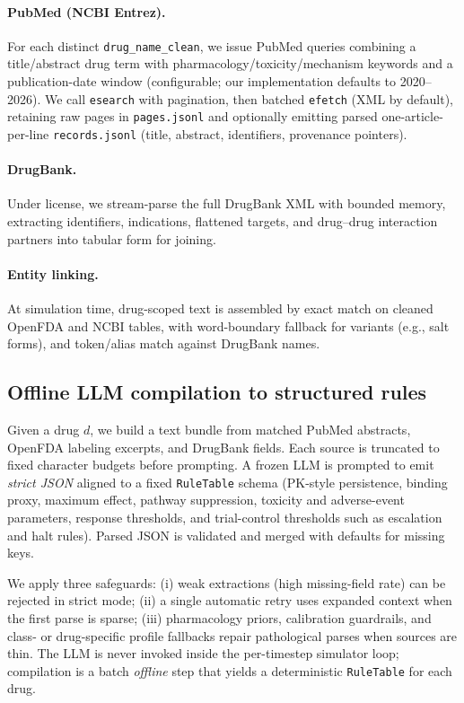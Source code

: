 \paragraph{PubMed (NCBI Entrez).}
For each distinct \texttt{drug\_name\_clean}, we issue PubMed queries combining a title/abstract drug term with pharmacology/toxicity/mechanism keywords and a publication-date window (configurable; our implementation defaults to 2020--2026). We call \texttt{esearch} with pagination, then batched \texttt{efetch} (XML by default), retaining raw pages in \texttt{pages.jsonl} and optionally emitting parsed one-article-per-line \texttt{records.jsonl} (title, abstract, identifiers, provenance pointers).

\paragraph{DrugBank.}
Under license, we stream-parse the full DrugBank XML with bounded memory, extracting identifiers, indications, flattened targets, and drug--drug interaction partners into tabular form for joining.

\paragraph{Entity linking.}
At simulation time, drug-scoped text is assembled by exact match on cleaned OpenFDA and NCBI tables, with word-boundary fallback for variants (e.g., salt forms), and token/alias match against DrugBank names.

\subsection{Offline LLM compilation to structured rules}
\label{sec:llm}

Given a drug $d$, we build a text bundle from matched PubMed abstracts, OpenFDA labeling excerpts, and DrugBank fields. Each source is truncated to fixed character budgets before prompting. A frozen LLM is prompted to emit \emph{strict JSON} aligned to a fixed \texttt{RuleTable} schema (PK-style persistence, binding proxy, maximum effect, pathway suppression, toxicity and adverse-event parameters, response thresholds, and trial-control thresholds such as escalation and halt rules). Parsed JSON is validated and merged with defaults for missing keys.

We apply three safeguards: (i) weak extractions (high missing-field rate) can be rejected in strict mode; (ii) a single automatic retry uses expanded context when the first parse is sparse; (iii) pharmacology priors, calibration guardrails, and class- or drug-specific profile fallbacks repair pathological parses when sources are thin. The LLM is never invoked inside the per-timestep simulator loop; compilation is a batch \emph{offline} step that yields a deterministic \texttt{RuleTable} for each drug.

